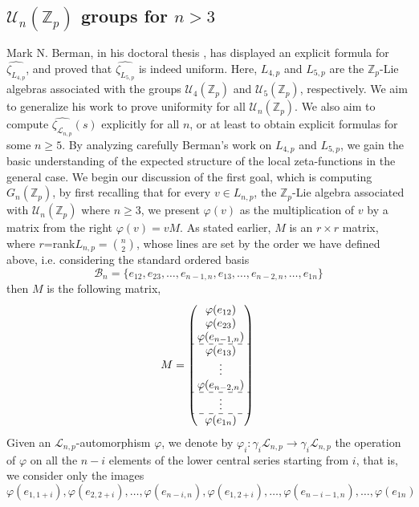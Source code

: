 \documentclass[12pt]{article}
\begin{document}
\subsection{$\mathcal{U}_n(\mathbb{Z}_p)$ groups for $n>3$}
Mark N. Berman, in his doctoral thesis \cite{Berman}, has displayed an explicit formula for $\hat{\zeta_{L_{4,p}}}$, and proved that $\hat{\zeta_{L_{5,p}}}$ is indeed uniform. Here, $L_{4,p}$ and $L_{5,p}$ are the $\mathbb{Z}_p$-Lie algebras associated with the groups $\mathcal{U}_4(\mathbb{Z}_p)$ and $\mathcal{U}_5(\mathbb{Z}_p)$, respectively. We aim to generalize his work to prove uniformity for all $\mathcal{U}_n(\mathbb{Z}_p)$. We also aim to compute $\hat{\zeta_{\mathcal{L}_{n,p}}}(s)$ explicitly for all $n$, or at least to obtain explicit formulas for some $n\geq 5$. By analyzing carefully Berman's work on $L_{4,p}$ and $L_{5,p}$, we gain the basic understanding of the expected structure of the local zeta-functions in the general case.
We begin our discussion of the first goal, which is computing $G_n(\mathbb{Z}_p)$, by first recalling that for every $v\in L_{n,p}$, the $\mathbb{Z}_p$-Lie algebra associated with $\mathcal{U}_n(\mathbb{Z}_p)$ where $n\geq3$, we present $\varphi(v)$ as the multiplication of $v$ by a matrix from the right $\varphi(v)=vM$. As stated earlier, $M$ is an $r\times r$ matrix, where $r$=rank$L_{n,p}=\binom{n}{2}$, whose lines are set by the order we have defined above, i.e. considering the standard ordered basis \[\mathcal{B}_n=\{e_{
12},e_{23},\dots,e_{n-1,n},e_{13},\dots,e_{n-2,n},\dots,e_{1n}\}\] then $M$ is the following matrix,
$$
M=\begin{pmatrix}
\varphi(e_{12})\\
\varphi(e_{23})\\
\varphi(e_{n-1,n})\\
\hdashline
\varphi(e_{13})\\
\vdots\\
\varphi(e_{n-2,n})\\
\hdashline
\vdots\\
\hdashline
\varphi(e_{1n})\\
\end{pmatrix}\\
$$
Given an $\mathcal{L}_{n,p}$-automorphism $\varphi$, we denote by $\varphi_i:\gamma_i\mathcal{L}_{n,p}\rightarrow\gamma_i\mathcal{L}_{n,p}$ the operation of $\varphi$ on all the $n-i$ elements of the lower central series starting from $i$, that is, we consider only the images \[\varphi(e_{1,1+i}),\varphi(e_{2,2+i}),\dots,\varphi(e_{n-i,n}),\varphi(e_{1,2+i}),\dots,\varphi(e_{n-i-1,n}),\dots,\varphi(e_{1n})\]
\end{document}
